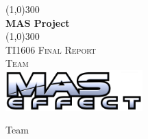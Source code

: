 \begin{titlepage}
	\begin{center}
		\vspace*{2cm}
		\line(1,0){300} \\ [2mm]
		\huge{\bf MAS Project} \\ [-3mm]
		\line(1,0){300} \\ [1cm]
		\textsc{\LARGE TI1606 Final Report} \\ [2cm]
		\textsc{Team} \\
		\vspace{2mm}
		\includegraphics[width=200px]{./contents/graphics/MAS-Effect.pdf}\\
		\vspace{1cm}
		
		\Large
		Team \\ [5mm]
		\normalsize
		

\end{center}
\end{titlepage}

